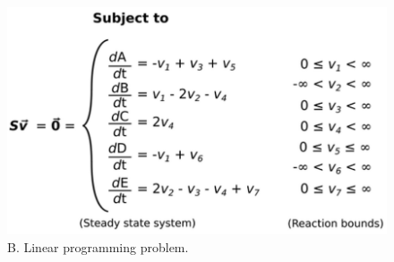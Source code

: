 \documentclass[8pt,usenames,dvipsnames]{beamer}
\begin{document}
\begin{frame}
{\begin{minipage}{0.5\textwidth}
\end{minipage}%
\begin{minipage}{0.5\textwidth}
\begin{figure}
\includegraphics[width=\textwidth]{figures/mass-balance-3}
\caption{B. Linear programming problem.}
\end{figure}

\end{minipage}



}
\end{frame}
\end{document}
